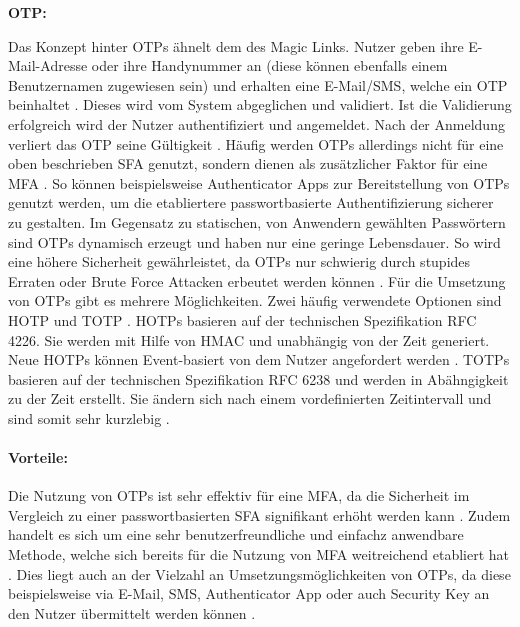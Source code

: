 \textbf{\ac{OTP}:}

Das Konzept hinter \ac{OTP}s ähnelt dem des Magic Links. Nutzer geben ihre E-Mail-Adresse oder ihre Handynummer an (diese können ebenfalls einem Benutzernamen zugewiesen sein) und erhalten eine E-Mail/SMS, welche ein \ac{OTP} beinhaltet \cite{chowhan2019password} \cite{parmar2022comprehensive}. 
Dieses wird vom System abgeglichen und validiert. Ist die Validierung erfolgreich wird der Nutzer authentifiziert und angemeldet. Nach der Anmeldung verliert das \ac{OTP} seine Gültigkeit \cite{chowhan2019password}.
Häufig werden \ac{OTP}s allerdings nicht für eine oben beschrieben \ac{SFA} genutzt, sondern dienen als zusätzlicher Faktor für eine \ac{MFA} \cite{chowhan2019password}. So können beispielsweise Authenticator Apps zur Bereitstellung von \ac{OTP}s genutzt werden, um die etabliertere passwortbasierte Authentifizierung sicherer zu gestalten.
Im Gegensatz zu statischen, von Anwendern gewählten
Passwörtern sind \ac{OTP}s dynamisch erzeugt und haben nur
eine geringe Lebensdauer. So wird eine höhere
Sicherheit gewährleistet, da \ac{OTP}s nur schwierig durch
stupides Erraten oder Brute Force Attacken erbeutet
werden können \cite{chowhan2019password}.
Für die Umsetzung von OTPs gibt es mehrere Möglichkeiten. Zwei häufig verwendete Optionen sind \ac{HOTP} und \ac{TOTP} \cite{chowhan2019password}.
\ac{HOTP}s basieren auf der technischen Spezifikation RFC 4226. Sie werden mit Hilfe von \ac{HMAC} und unabhängig von der Zeit generiert. Neue \ac{HOTP}s können Event-basiert von dem Nutzer angefordert werden \cite{chowhan2019password}.
\ac{TOTP}s basieren auf der technischen Spezifikation RFC 6238 und werden in Abähngigkeit zu der Zeit erstellt. Sie ändern sich nach einem vordefinierten Zeitintervall und sind somit sehr kurzlebig \cite{chowhan2019password}.

\paragraph*{Vorteile:} Die Nutzung von \ac{OTP}s ist sehr effektiv für eine \ac{MFA}, da die Sicherheit im Vergleich zu einer passwortbasierten \ac{SFA} signifikant erhöht werden kann \cite{chowhan2019password} \cite{parmar2022comprehensive}. Zudem handelt es sich um eine sehr benutzerfreundliche und einfachz anwendbare Methode, welche sich bereits für die Nutzung von \ac{MFA} weitreichend etabliert hat \cite{parmar2022comprehensive}. Dies liegt auch an der Vielzahl an Umsetzungsmöglichkeiten von \ac{OTP}s, da diese beispielsweise via E-Mail, SMS, Authenticator App oder auch Security Key an den Nutzer übermittelt werden können \cite{chowhan2019password} \cite{parmar2022comprehensive}. 

